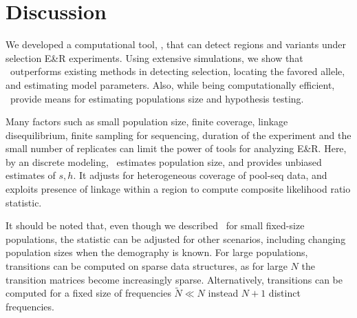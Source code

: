 \section{Discussion}
We developed a computational tool, \comale, that can detect regions
and variants under selection E\&R experiments. Using extensive simulations, 
we show that \comale\
outperforms existing methods in detecting selection, locating the
favored allele, and estimating model parameters.  Also, while
being computationally efficient, \comale\ provide means for estimating
populations size and hypothesis testing.

Many factors such as small population size, finite coverage, linkage
disequilibrium, finite sampling for sequencing, duration of the
experiment and the small number of replicates can limit the power of
tools for analyzing E\&R.  Here, by an discrete modeling, \comale\
estimates population size, and provides unbiased estimates of
$s,h$. It adjusts for heterogeneous coverage of pool-seq data, and
exploits presence of linkage within a region to compute composite
likelihood ratio statistic.


It should be noted that, even though we described \comale\ for small
fixed-size populations, the statistic can be adjusted for other
scenarios, including changing population sizes when the demography is
known. For large populations, transitions can be computed on sparse data 
structures, as for large $N$ the transition matrices become increasingly 
sparse. Alternatively, transitions can be computed 
for a fixed
size of frequencies $\widetilde{N} \ll N$ instead $N+1$ distinct frequencies.




